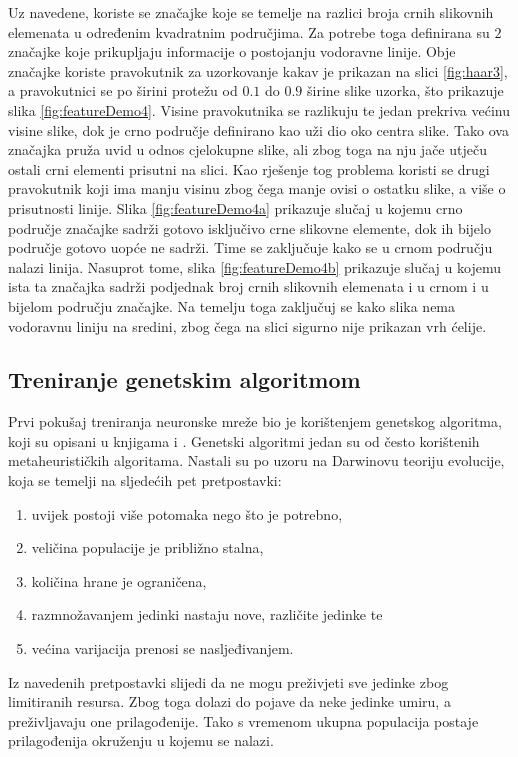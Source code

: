 \documentclass[times, utf8, zavrsni, numeric]{fer}
\begin{document}
Uz navedene, koriste se značajke koje se temelje na razlici broja crnih slikovnih elemenata u određenim kvadratnim područjima.
Za potrebe toga definirana su $2$ značajke koje prikupljaju informacije o postojanju vodoravne linije. 
Obje značajke koriste pravokutnik za uzorkovanje kakav je prikazan na slici \ref{fig:haar3}, a pravokutnici se po širini protežu od $0.1$ do $0.9$ širine slike uzorka, što prikazuje slika \ref{fig:featureDemo4}.
Visine pravokutnika se razlikuju te jedan prekriva većinu visine slike, dok je crno područje definirano kao uži dio oko centra slike.
Tako ova značajka pruža uvid u odnos cjelokupne slike, ali zbog toga na nju jače utječu ostali crni elementi prisutni na slici.
Kao rješenje tog problema koristi se drugi pravokutnik koji ima manju visinu zbog čega manje ovisi o ostatku slike, a više o prisutnosti linije.
Slika \ref{fig:featureDemo4a} prikazuje slučaj u kojemu crno područje značajke sadrži gotovo isključivo crne slikovne elemente, dok ih bijelo područje gotovo uopće ne sadrži.
Time se zaključuje kako se u crnom području nalazi linija.
Nasuprot tome, slika \ref{fig:featureDemo4b} prikazuje slučaj u kojemu ista ta značajka sadrži podjednak broj crnih slikovnih elemenata i u crnom i u bijelom području značajke.
Na temelju toga zaključuj se kako slika nema vodoravnu liniju na sredini, zbog čega na slici sigurno nije prikazan vrh ćelije.

\subsection{Treniranje genetskim algoritmom}
Prvi pokušaj treniranja neuronske mreže bio je korištenjem genetskog algoritma, koji su opisani u knjigama \cite{optjava} i \cite{GeneticAlgorithms}.
Genetski algoritmi jedan su od često korištenih metaheurističkih algoritama.
Nastali su po uzoru na Darwinovu teoriju evolucije, koja se temelji na sljedećih pet pretpostavki: 
\begin{enumerate}
\item uvijek postoji više potomaka nego što je potrebno,
\item veličina populacije je približno stalna,
\item količina hrane je ograničena,
\item razmnožavanjem jedinki nastaju nove, različite jedinke te
\item većina varijacija prenosi se nasljeđivanjem.
\end{enumerate}
Iz navedenih pretpostavki slijedi da ne mogu preživjeti sve jedinke zbog limitiranih resursa.
Zbog toga dolazi do pojave da neke jedinke umiru, a preživljavaju one prilagođenije.
Tako s vremenom ukupna populacija postaje prilagođenija okruženju u kojemu se nalazi.\\
\end{document}
